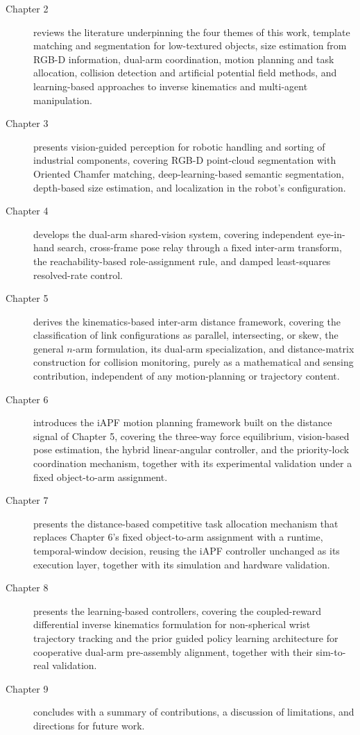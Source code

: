 \begin{description}
    \item[Chapter 2] reviews the literature underpinning the four themes of this work, template
    matching and segmentation for low-textured objects, size estimation from RGB-D information,
    dual-arm coordination, motion planning and task allocation, collision detection and artificial potential field methods, and learning-based approaches to inverse kinematics and multi-agent manipulation.

    \item[Chapter 3] presents vision-guided perception for robotic handling and sorting of industrial components, covering
    RGB-D point-cloud segmentation with Oriented Chamfer matching, deep-learning-based semantic
    segmentation, depth-based size estimation, and localization in the robot's configuration.

    \item[Chapter 4] develops the dual-arm shared-vision system, covering independent eye-in-hand
    search, cross-frame pose relay through a fixed inter-arm transform, the reachability-based
    role-assignment rule, and damped least-squares resolved-rate control.

    \item[Chapter 5] derives the kinematics-based inter-arm distance framework, covering the
    classification of link configurations as parallel, intersecting, or skew, the general $n$-arm
    formulation, its dual-arm specialization, and distance-matrix construction for collision
    monitoring, purely as a mathematical and sensing contribution, independent of any motion-planning or trajectory content.

    \item[Chapter 6] introduces the iAPF motion planning framework built on the distance signal of
    Chapter 5, covering the three-way force equilibrium, vision-based pose estimation, the hybrid
    linear-angular controller, and the priority-lock coordination mechanism, together with its
    experimental validation under a fixed object-to-arm
    assignment.

    \item[Chapter 7] presents the distance-based competitive task allocation mechanism that replaces
    Chapter 6's fixed object-to-arm assignment with a runtime, temporal-window decision, reusing the
    iAPF controller unchanged as its execution layer, together with its simulation and hardware
    validation.

    \item[Chapter 8] presents the learning-based controllers, covering the coupled-reward
    differential inverse kinematics formulation for non-spherical wrist trajectory tracking and the
    prior guided policy learning architecture for cooperative dual-arm pre-assembly alignment,
    together with their sim-to-real validation.

    \item[Chapter 9] concludes with a summary of contributions, a discussion of limitations, and
    directions for future work.
\end{description}

